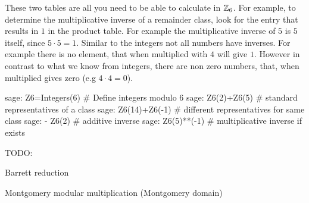 \begin{example} 
These two tables are all you need to be able to calculate in $ \mathbb{Z}_6 $. For example, to determine the multiplicative inverse of a remainder class, look for the entry that results in $ 1 $ in the product table. For example the multiplicative inverse of $ 5 $ is $ 5 $ itself, since $5\cdot 5 = 1$. Similar to the integers not all numbers have inverses. For example there is no element, that when multiplied with $4$ will give $1$. 
However in contrast to what we know from integers, there are non zero numbers, that, when multiplied gives zero (e.g $4\cdot 4 =0$).

\begin{sagecommandline}
sage: Z6=Integers(6) # Define integers modulo 6 
sage: Z6(2)+Z6(5) # standard representatives of a class
sage: Z6(14)+Z6(-1) # different representatives for same class
sage: - Z6(2) # additive inverse
sage: Z6(5)**(-1) # multiplicative inverse if exists
\end{sagecommandline}
\end{example}

TODO:

Barrett reduction

Montgomery modular multiplication (Montgomery domain)



